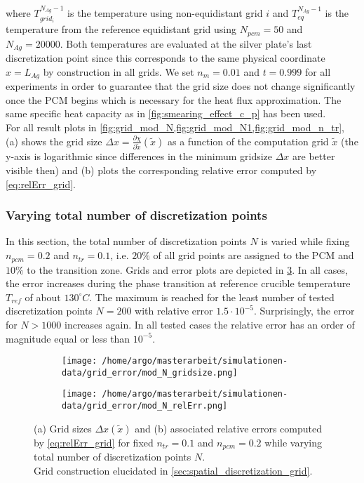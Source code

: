 \documentclass{scrartcl}[12pt, halfparskip]
\numberwithin{equation}{section}
\numberwithin{figure}{section}
\numberwithin{table}{section}
\begin{document}
where $T_{grid_i}^{N_{Ag}-1}$ is the temperature using non-equidistant grid $i$ and $T_{eq}^{N_{Ag}-1}$ is the temperature from the reference equidistant grid using $N_{pcm}=50$ and $N_{Ag}=20000$. Both temperatures are evaluated at the silver plate's last discretization point since this corresponds to the same physical coordinate $x=L_{Ag}$ by construction in all grids. 
We set $n_m=0.01$ and $t=0.999$ for all experiments in order to guarantee that the grid size does not change significantly once the PCM begins which is necessary for the heat flux approximation. The same specific heat capacity as in \cref{fig:smearing_effect_c_p} has been used. \\
For all result plots in \cref{fig:grid_mod_N,fig:grid_mod_N1,fig:grid_mod_n_tr}, (a) shows the grid size $\Delta x = \frac{\partial \chi}{\partial \tilde{x}}(\tilde{x})$ as a function of the computation grid $\tilde{x}$ (the y-axis is logarithmic since differences in the minimum gridsize $\Delta x$ are better visible then) and (b) plots the corresponding relative error computed by \cref{eq:relErr_grid}.

\subsubsection{Varying total number of discretization points}
In this section, the total number of discretization points $N$ is varied while fixing $n_{pcm}=0.2$ and $n_{tr}=0.1$, i.e. $20\%$ of all grid points are assigned to the PCM and $10\%$ to the transition zone. Grids and error plots are depicted in \cref{fig:grid_mod_N}.
In all cases, the error increases during the phase transition at reference crucible temperature $T_{ref}$ of about $130^{\circ} C$. The maximum is reached for the least number of tested discretization points $N=200$ with relative error $1.5 \cdot 10^{-5}$. Surprisingly, the error for $N > 1000$ increases again. In all tested cases the relative error has an order of magnitude equal or less than $10^{-5}$. 


\begin{figure}[H]
	\begin{subfigure}{0.49\textwidth}
		\texttt{[image: /home/argo/masterarbeit/simulationen-data/grid\_error/mod\_N\_gridsize.png]}
		\caption{}
		\label{fig:gridsize_mod_N}
	\end{subfigure}
	\begin{subfigure}{0.49\textwidth}
		\texttt{[image: /home/argo/masterarbeit/simulationen-data/grid\_error/mod\_N\_relErr.png]}
		\caption{}
		\label{fig:grid_relErr_mod_N}
	\end{subfigure}
	\caption{(a) Grid sizes $\Delta x(\tilde{x})$ and (b) associated relative errors computed by \cref{eq:relErr_grid} for fixed $n_{tr}=0.1$ and $n_{pcm}=0.2$ while varying total number of discretization points $N$. \\
	Grid construction elucidated in \cref{sec:spatial_discretization_grid}.}
	\label{fig:grid_mod_N}
\end{figure}
\end{document}
